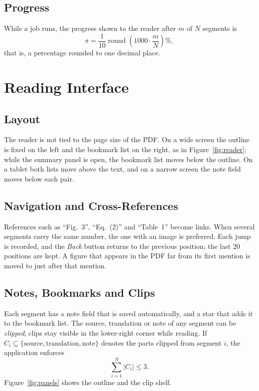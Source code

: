 \documentclass[11pt]{article}
\begin{document}
\subsection{Progress}
While a job runs, the progress shown to the reader after $m$ of $N$ segments is
\begin{equation}
  \pi = \frac{1}{10}\operatorname{round}\!\left( 1000 \cdot \frac{m}{N} \right) \%,
  \label{eq:progress}
\end{equation}
that is, a percentage rounded to one decimal place.

\section{Reading Interface}
\label{sec:reader}

\subsection{Layout}
The reader is not tied to the page size of the PDF. On a wide screen the outline is fixed on the left and the bookmark list on the right, as in Figure~\ref{fig:reader}; while the summary panel is open, the bookmark list moves below the outline. On a tablet both lists move above the text, and on a narrow screen the note field moves below each pair.

\subsection{Navigation and Cross-References}
References such as ``Fig.~3'', ``Eq.~(2)'' and ``Table~1'' become links. When several segments carry the same number, the one with an image is preferred. Each jump is recorded, and the \emph{Back} button returns to the previous position; the last 20 positions are kept. A figure that appears in the PDF far from its first mention is moved to just after that mention.

\subsection{Notes, Bookmarks and Clips}
Each segment has a note field that is saved automatically, and a star that adds it to the bookmark list. The source, translation or note of any segment can be \emph{clipped}; clips stay visible in the lower-right corner while reading. If $C_i \subseteq \{\text{source}, \text{translation}, \text{note}\}$ denotes the parts clipped from segment $i$, the application enforces
\begin{equation}
  \sum_{i=1}^{N} \lvert C_i \rvert \le 3 .
  \label{eq:clips}
\end{equation}
Figure~\ref{fig:panels} shows the outline and the clip shelf.
\end{document}
